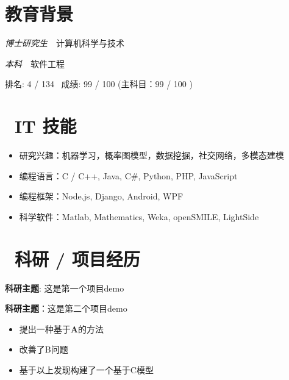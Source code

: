 \documentclass{resume}
\begin{document}

{\heiti {}}

 
\section{\faGraduationCap 教育背景}

\textit{博士研究生}\ \ 计算机科学与技术

\textit{本科}\ \ 软件工程

排名: 4 / 134 \ 成绩: 99 / 100 (主科目：99 / 100 )


\section{\faCogs\ IT 技能}
\begin{itemize}[parsep=0.5ex]
  \item 研究兴趣：机器学习，概率图模型，数据挖掘，社交网络，多模态建模
  \item 编程语言：C / C++, Java, C\#, Python, PHP, JavaScript
  \item 编程框架：Node.js, Django, Android, WPF
  \item 科学软件：Matlab, Mathematics, Weka, openSMILE, LightSide
\end{itemize}


\section{\faUsers\ 科研 / 项目经历}
\textbf{科研主题}: 这是第一个项目demo

\textbf{科研主题}：这是第二个项目demo
\begin{itemize}
\item 提出一种基于\textbf{A}的方法
\item 改善了B问题
\item 基于以上发现构建了一个基于C模型
\end{itemize}
\end{document}
